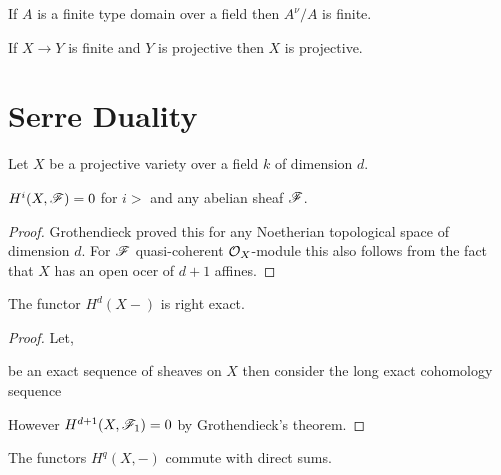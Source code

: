 \documentclass[12pt]{article}
\begin{document}
\begin{proposition}
If $A$ is a finite type domain over a field then $A^\nu / A$ is finite. 
\end{proposition}

\begin{proposition}
If $X \to Y$ is finite and $Y$ is projective then $X$ is projective.
\end{proposition}

\section{Serre Duality}

\begin{remark}
Let $X$ be a projective variety over a field $k$ of dimension $d$.
\end{remark}

\begin{theorem}
$H^i(X, \mathscr{F}) = 0$ for $i > $ and any abelian sheaf $\mathscr{F}$. 
\end{theorem}

\begin{proof}
Grothendieck proved this for any Noetherian topological space of dimension $d$. For $\mathscr{F}$ quasi-coherent $\mathcal{O}_{X}$-module this also follows from the fact that $X$ has an open ocer of $d+1$ affines. 
\end{proof}

\begin{theorem}
The functor $H^d(X -)$ is right exact.
\end{theorem}

\begin{proof}
Let,
\begin{center}
\end{center}
be an exact sequence of sheaves on $X$ then consider the long exact cohomology sequence
\begin{center}
\end{center}
However $H^{d+1}(X, \mathscr{F}_1) = 0$ by Grothendieck's theorem.
\end{proof}

\begin{theorem}
The functors $H^q(X, -)$ commute with direct sums. 
\end{theorem}
\end{document}
